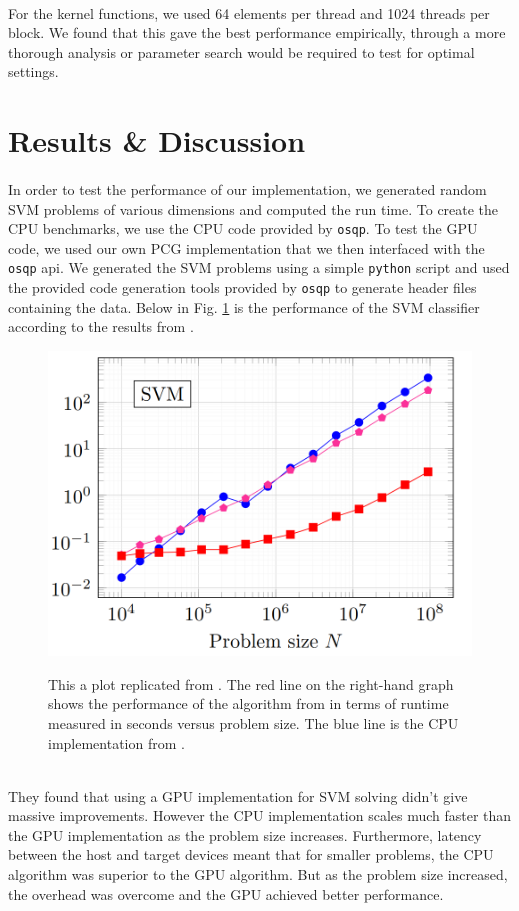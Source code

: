 \documentclass[justified,nobib]{tufte-handout}
\begin{document}
\begin{fullwidth}
\paragraph{} For the kernel functions, we used 64 elements per thread and 1024 threads per block. We found that this gave the best performance empirically, through a more thorough analysis or parameter search would be required to test for optimal settings.
 
 
\section{Results \& Discussion}
\paragraph{} In order to test the performance of our implementation, we generated random SVM problems of various dimensions and computed the run time. To create the CPU benchmarks, we use the CPU code provided by \texttt{osqp}. To test the GPU code, we used our own PCG implementation that we then interfaced with the \texttt{osqp} api. We generated the SVM problems using a simple \texttt{python} script and used the provided code generation tools provided by \texttt{osqp} to generate header files containing the data. Below in Fig. \ref{fig:cuosqp_results} is the performance of the SVM classifier according to the results from \citep{cuosqp}. 
\begin{figure}[h]
\includegraphics[scale=.25]{./media/cuosqp_results.png}
\label{fig:cuosqp_results}
\caption{This a plot replicated from \cite{cuosqp}. The red line on the right-hand graph shows the performance of the algorithm from \citep{cuosqp} in terms of runtime measured in seconds versus problem size. The blue line is the CPU implementation from \cite{osqp}. }
\end{figure}\\
They found that using a GPU implementation for SVM solving didn't give massive improvements. However the CPU implementation scales much faster than the GPU implementation as the problem size increases. Furthermore, latency between the host and target devices meant that for smaller problems, the CPU algorithm was superior to the GPU algorithm. But as the problem size increased, the overhead was overcome and the GPU achieved better performance.

\end{fullwidth}
\end{document}
